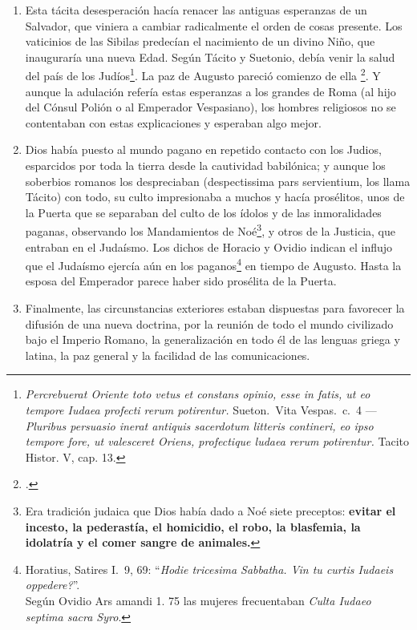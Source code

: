 \raggedbottom{} \documentclass[12pt, a4paper, openany]{book} %
\begin{document}
\begin{enumerate}
\begin{enumerate}
        \end{enumerate}
  \item Esta tácita desesperación hacía renacer las antiguas esperanzas de un Salvador, que viniera a cambiar radicalmente el orden de cosas presente. Los vaticinios de las Sibilas predecían el nacimiento de un divino Niño, que inauguraría una nueva Edad. Según Tácito y Suetonio, debía venir la salud del país de los Judíos\textdagger\footnote{\textit{\guillemetleft Percrebuerat Oriente toto vetus et constans opinio, esse in fatis, ut eo tempore Iudaea profecti rerum potirentur.\guillemetright} Sueton.\ Vita Vespas.\ c.\ 4 --- \textit{\guillemetleft Pluribus persuasio inerat antiquis sacerdotum litteris contineri, eo ipso tempore fore, ut valesceret Oriens, profectique ludaea rerum potirentur.\guillemetright} Tacito Histor. V, cap. 13.}. La paz de Augusto pareció comienzo de ella \footcite{Virgil40EglogaIV}. Y aunque la adulación refería estas esperanzas a los grandes de Roma (al hijo del Cónsul Polión o al Emperador Vespasiano), los hombres religiosos no se contentaban con estas explicaciones y esperaban algo mejor.
  \item Dios había puesto al mundo pagano en repetido contacto con los Judios, esparcidos por toda la tierra desde la cautividad babilónica; y aunque los soberbios romanos los despreciaban (despectissima pars servientium, los llama Tácito) con todo, su culto impresionaba a muchos y hacía prosélitos, unos de la Puerta que se separaban del culto de los ídolos y de las inmoralidades paganas, observando los Mandamientos de Noé\textdagger\footnote{Era tradición judaica que Dios había dado a Noé siete preceptos: \textbf{evitar el incesto, la pederastía, el homicidio, el robo, la blasfemia, la idolatría y el comer sangre de animales.}}, y otros de la Justicia, que entraban en el Judaísmo. Los dichos de Horacio y Ovidio indican el influjo que el Judaísmo ejercía aún en los paganos\textdagger\footnote{Horatius, Satires I.\ 9, 69: ``\textit{Hodie tricesima Sabbatha. Vin tu curtis Iudaeis oppedere?}''.\\ Según Ovidio Ars amandi 1. 75 las mujeres frecuentaban \textit{Culta Iudaeo septima sacra Syro}.} en tiempo de Augusto. Hasta la esposa del Emperador parece haber sido prosélita de la Puerta.
  \item Finalmente, las circunstancias exteriores estaban dispuestas para favorecer la difusión de una nueva doctrina, por la reunión de todo el mundo civilizado bajo el Imperio Romano, la generalización en todo él de las lenguas griega y latina, la paz general y la facilidad de las comunicaciones.
\end{enumerate}
\end{document}
